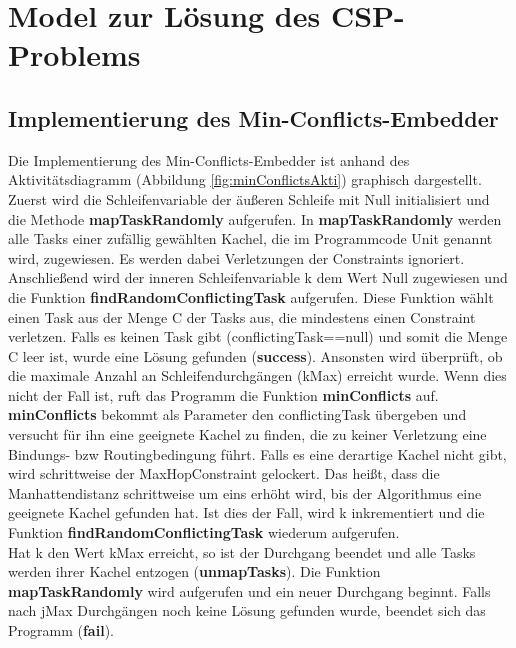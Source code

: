 \chapter{Model zur Lösung des CSP-Problems}\label{model}
\section{Implementierung des Min-Conflicts-Embedder}

Die Implementierung des Min-Conflicts-Embedder ist anhand des Aktivitätsdiagramm (Abbildung \ref{fig:minConflictsAkti}) graphisch dargestellt. Zuerst wird die Schleifenvariable der äußeren Schleife mit Null initialisiert und die Methode \textbf{mapTaskRandomly} aufgerufen. In \textbf{mapTaskRandomly} werden alle Tasks einer zufällig gewählten Kachel, die im Programmcode Unit genannt wird, zugewiesen. Es werden dabei Verletzungen der Constraints ignoriert. Anschließend wird der inneren Schleifenvariable k dem Wert Null zugewiesen und die Funktion \textbf{findRandomConflictingTask} aufgerufen. Diese Funktion wählt einen Task aus der Menge C der Tasks aus, die mindestens einen Constraint verletzen. Falls es keinen Task gibt (conflictingTask==null) und somit die Menge C leer ist, wurde eine Lösung gefunden (\textbf{success}). Ansonsten wird überprüft, ob die maximale Anzahl an Schleifendurchgängen (kMax) erreicht wurde. Wenn dies nicht der Fall ist, ruft das Programm die Funktion \textbf{minConflicts} auf. \textbf{minConflicts} bekommt als Parameter den conflictingTask übergeben und versucht für ihn eine geeignete Kachel zu finden, die zu keiner Verletzung eine Bindungs- bzw Routingbedingung führt. Falls es eine derartige Kachel nicht gibt, wird schrittweise der MaxHopConstraint gelockert. Das heißt, dass die Manhattendistanz schrittweise um eins erhöht wird, bis der Algorithmus eine geeignete Kachel gefunden hat. Ist dies der Fall, wird k inkrementiert und die Funktion \textbf{findRandomConflictingTask} wiederum aufgerufen. \\
Hat k den Wert kMax erreicht, so ist der Durchgang beendet und alle Tasks werden ihrer Kachel entzogen (\textbf{unmapTasks}). Die Funktion \textbf{mapTaskRandomly} wird aufgerufen und ein neuer Durchgang beginnt. Falls nach jMax Durchgängen noch keine Lösung gefunden wurde, beendet sich das Programm (\textbf{fail}).

